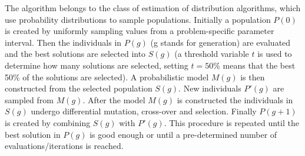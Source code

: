 The algorithm belongs to the class of estimation of distribution algorithms, which use probability distributions to sample populations. Initially a population $P(0)$ is created by uniformly sampling values from a problem-specific parameter interval. Then the individuals in $P(g)$ (g stands for generation) are evaluated and the best solutions are selected into $S(g)$ (a threshold variable $t$ is used to determine how many solutions are selected, setting $t=50\%$ means that the best 50\% of the solutions are selected). A probabilistic model $M(g)$ is then constructed from the selected population $S(g)$. New individuals $P'(g)$ are sampled from $M(g)$. After the model $M(g)$ is constructed the individuals in $S(g)$ undergo differential mutation, cross-over and selection. Finally $P(g+1)$ is created by combining $S(g)$ with $P'(g)$. This procedure is repeated until the best solution in $P(g)$ is good enough or until a pre-determined number of evaluations/iterations is reached.

